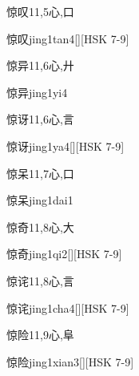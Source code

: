 \begin{Entry}{惊叹}{11,5}{⼼,⼝}
  \begin{Phonetics}{惊叹}{jing1tan4}[][HSK 7-9]
  \end{Phonetics}
\end{Entry}

\begin{Entry}{惊异}{11,6}{⼼,⼶}
  \begin{Phonetics}{惊异}{jing1yi4}
  \end{Phonetics}
\end{Entry}

\begin{Entry}{惊讶}{11,6}{⼼,⾔}
  \begin{Phonetics}{惊讶}{jing1ya4}[][HSK 7-9]
  \end{Phonetics}
\end{Entry}

\begin{Entry}{惊呆}{11,7}{⼼,⼝}
  \begin{Phonetics}{惊呆}{jing1dai1}
  \end{Phonetics}
\end{Entry}

\begin{Entry}{惊奇}{11,8}{⼼,⼤}
  \begin{Phonetics}{惊奇}{jing1qi2}[][HSK 7-9]
  \end{Phonetics}
\end{Entry}

\begin{Entry}{惊诧}{11,8}{⼼,⾔}
  \begin{Phonetics}{惊诧}{jing1cha4}[][HSK 7-9]
  \end{Phonetics}
\end{Entry}

\begin{Entry}{惊险}{11,9}{⼼,⾩}
  \begin{Phonetics}{惊险}{jing1xian3}[][HSK 7-9]
  \end{Phonetics}
\end{Entry}

